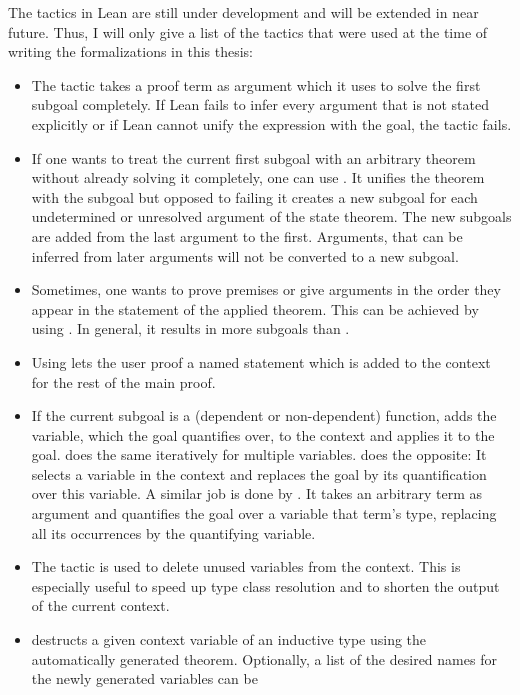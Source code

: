 The tactics in Lean are still under development and will be extended in near
future.
Thus, I will only give a list of the tactics that were used at the time of
writing the formalizations in this thesis:
\begin{itemize}
\item The tactic  takes a proof term as argument which it uses
to solve the first subgoal completely.
If Lean fails to infer every argument that is not stated explicitly or if Lean
cannot unify the expression with the goal, the tactic fails.
\item If one wants to treat the current first subgoal with an arbitrary theorem
without already solving it completely, one can use .
It unifies the theorem with the subgoal but opposed to failing it creates a new
subgoal for each undetermined or unresolved argument of the state theorem.
The new subgoals are added from the last argument to the first.
Arguments, that can be inferred from later arguments will not be converted to a
new subgoal.
\item Sometimes, one wants to prove premises or give arguments in the order
they appear in the statement of the applied theorem.
This can be achieved by using .
In general, it results in more subgoals than .
\item Using  lets the user proof a named statement which is added
to the context for the rest of the main proof.
\item If the current subgoal is a (dependent or non-dependent) function, 
adds the variable, which the goal quantifies over, to the context and applies it
to the goal.  does the same iteratively for multiple variables.
 does the opposite: It selects a variable in the context and
replaces the goal by its quantification over this variable.
A similar job is done by .
It takes an arbitrary term as argument and quantifies the goal over a variable
that term's type, replacing all its occurrences by the quantifying variable.
\item The tactic  is used to delete unused variables from the context.
This is especially useful to speed up type class resolution and to shorten the output
of the current context.
\item {} destructs a given context variable of an inductive type 
using the automatically generated  theorem.
Optionally, a list of the desired names for the newly generated variables can be

\end{itemize}

